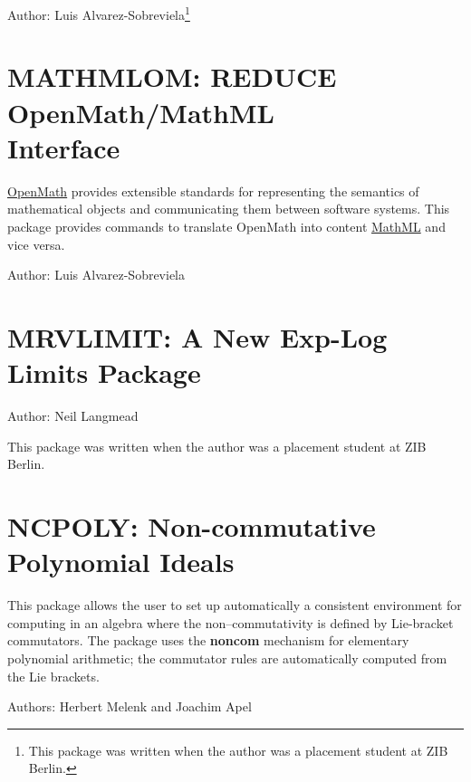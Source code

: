 Author: Luis Alvarez-Sobreviela\footnote{This package was written when
the author was a placement student at ZIB Berlin.}



\newpage

\section[MATHMLOM: REDUCE OpenMath/MathML Interface]{MATHMLOM: REDUCE OpenMath/MathML\\Interface}

\href{https://openmath.org/}{OpenMath} provides extensible standards
for representing the semantics of mathematical objects and
communicating them between software systems.  This package provides
commands to translate OpenMath into content
\href{https://www.w3.org/Math/}{MathML} and vice versa.

Author: Luis Alvarez-Sobreviela



\newpage

\section{MRVLIMIT: A New Exp-Log Limits Package}

Author: Neil Langmead

This package was written when the author was a placement student at ZIB Berlin.



\newpage

\section{NCPOLY: Non-commutative Polynomial Ideals}

This package allows the user to set up automatically a consistent
environment for computing in an algebra where the non--commutativity is
defined by Lie-bracket commutators.  The package uses the {\REDUCE} \textbf{noncom}
mechanism for elementary polynomial arithmetic; the commutator
rules are automatically computed from the Lie brackets.

Authors: Herbert Melenk and Joachim Apel



